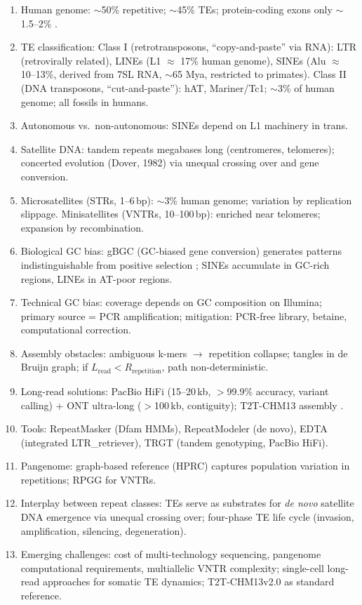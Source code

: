 \clearpage
\begin{revise}\small
\begin{enumerate}[itemsep=0pt, topsep=0pt, parsep=0pt]
    \item Human genome: $\sim$50\% repetitive; $\sim$45\% TEs; protein-coding exons only $\sim$1.5--2\% \parencite{lander2001,dekonig2011}.
    \item TE classification: Class I (retrotransposons, ``copy-and-paste'' via RNA): LTR (retrovirally related), LINEs (L1 $\approx$ 17\% human genome), SINEs (Alu $\approx$ 10--13\%, derived from 7SL RNA, $\sim$65 Mya, restricted to primates). Class II (DNA transposons, ``cut-and-paste''): hAT, Mariner/Tc1; $\sim$3\% of human genome; all fossils in humans.
    \item Autonomous vs.\ non-autonomous: SINEs depend on L1 machinery in trans.
    \item Satellite DNA: tandem repeats megabases long (centromeres, telomeres); concerted evolution (Dover, 1982) via unequal crossing over and gene conversion.
    \item Microsatellites (STRs, 1--6\,bp): $\sim$3\% human genome; variation by replication slippage. Minisatellites (VNTRs, 10--100\,bp): enriched near telomeres; expansion by recombination.
    \item Biological GC bias: gBGC (GC-biased gene conversion) generates patterns indistinguishable from positive selection \parencite{galtier2001}; SINEs accumulate in GC-rich regions, LINEs in AT-poor regions.
    \item Technical GC bias: coverage depends on GC composition on Illumina; primary source = PCR amplification; mitigation: PCR-free library, betaine, computational correction.
    \item Assembly obstacles: ambiguous k-mers $\to$ repetition collapse; tangles in de Bruijn graph; if $L_{\text{read}} < R_{\text{repetition}}$, path non-deterministic.
    \item Long-read solutions: PacBio HiFi (15--20\,kb, $>$99.9\% accuracy, variant calling) + ONT ultra-long ($>$100\,kb, contiguity); T2T-CHM13 assembly \parencite{nurk2022}.
    \item Tools: RepeatMasker (Dfam HMMs), RepeatModeler (de novo), EDTA (integrated LTR\_retriever), TRGT (tandem genotyping, PacBio HiFi).
    \item Pangenome: graph-based reference (HPRC) captures population variation in repetitions; RPGG for VNTRs.
    \item Interplay between repeat classes: TEs serve as substrates for \textit{de novo} satellite DNA emergence via unequal crossing over; four-phase TE life cycle (invasion, amplification, silencing, degeneration).
    \item Emerging challenges: cost of multi-technology sequencing, pangenome computational requirements, multiallelic VNTR complexity; single-cell long-read approaches for somatic TE dynamics; T2T-CHM13v2.0 as standard reference.
\end{enumerate}
\end{revise}

\clearpage

\printbibliography[heading=subbibliography,title={References}]

